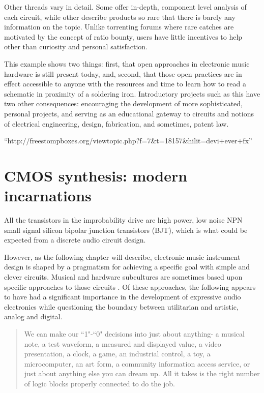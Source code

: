 Other threads vary in detail. Some offer in-depth, component level analysis of each circuit, while other describe products so rare that there is barely any information on the topic. Unlike torrenting forums where rare catches are motivated by the concept of ratio bounty, users have little incentives to help other than curiosity and personal satisfaction. 


This example shows two things: first, that open approaches in electronic music hardware is still present today, and, second, that those open practices are in effect accessible to anyone with the resources and time to learn how to read a schematic in proximity of a soldering iron. Introductory projects such as this have two other consequences: encouraging the development of more sophisticated, personal projects, and serving as an educational gateway to circuits and notions of electrical engineering, design, fabrication, and sometimes, patent law. 

``http://freestompboxes.org/viewtopic.php?f=7&t=18157&hilit=devi+ever+fx''

\section{CMOS synthesis: modern incarnations}

All the transistors in the improbability drive are high power, low noise NPN small signal silicon bipolar junction transistors (BJT), which is what could be expected from a discrete audio circuit  design. 

However, as the following chapter will describe, electronic music instrument design is shaped by a pragmatism for achieving a specific goal with simple and clever circuits. Musical and hardware subcultures are sometimes based upon specific approaches to those circuits \citep{ghazala2005,collins2006,hegarty2007,novak2013}. Of these approaches, the following appears to have had a significant importance in the development of expressive audio electronics while questioning the boundary between utilitarian and artistic, analog and digital. 


\begin{quote}
	
	We can make our ``1"-``0" decisions into just about anything- a musical note, a test waveform, a measured and displayed value, a video presentation, a clock, a game, an industrial control, a toy, a microcomputer, an art form, a community information access service, or just about anything else you can dream up. All it takes is the right number of logic blocks properly connected to do the job.
	\citep[pp-7-8]{lancaster1988}
	
\end{quote}

